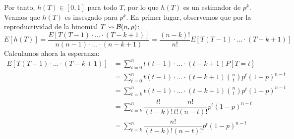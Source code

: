 \begin{ejercicio}
\begin{enumerate}
            Por tanto, $h(T)\in [0,1]$ para todo $T$, por lo que $h(T)$ es un estimador de $p^k$. Veamos que $h(T)$ es insesgado para $p^k$. En primer lugar, observemos que por la reproductividad de la binomial $T\rightsquigarrow \mathcal{B}(n,p)$:
            \begin{equation*}
                E[h(T)] = \dfrac{E[T(T-1)\cdot \ldots\cdot (T-k+1)]}{n(n-1)\cdot \ldots\cdot (n-k+1)} = \dfrac{(n-k)!}{n!}E[T(T-1)\cdot \ldots\cdot (T-k+1)]
            \end{equation*}
            Calculamos ahora la esperanza:
            \begin{align*}
                E[T(T-1)\cdot \ldots\cdot (T-k+1)] &= \sum_{t=0}^{n}t(t-1)\cdot \ldots\cdot (t-k+1)P[T=t] \\ 
                                                   &= \sum_{t=0}^{n}t(t-1)\cdot \ldots\cdot (t-k+1)\binom{n}{t}p^t{(1-p)}^{n-t} \\
                                                   &= \sum_{t=k}^{n}t(t-1)\cdot \ldots\cdot(t-k+1) \binom{n}{t}p^t {(1-p)}^{n-t} \\
                                                   &= \sum_{t=k}^{n}\dfrac{t!}{(t-k)!}\dfrac{n!}{t!(n-t)!}p^t {(1-p)}^{n-t} \\
                                                   &= \sum_{t=k}^{n}\dfrac{n!}{(t-k)!(n-t)!}p^t {(1-p)}^{n-t}
            \end{align*}
            

\end{enumerate}
\end{ejercicio}

